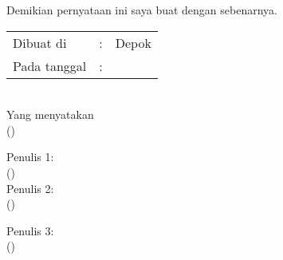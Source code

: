 \noindent Demikian pernyataan ini saya buat dengan sebenarnya.

\ifx\blank\npmDua\else\clearpage\fi



\begin{center}
	\vspace*{0.8cm}
	\begin{tabular}{lll}
		Dibuat di&: & Depok \\
		Pada tanggal&: & \tanggalSiapSidang \\
	\end{tabular}\\

	\vspace*{0.2cm}
	Yang menyatakan \\
	\ifx\blank\npmDua
		\vspace*{2cm}
		(\penulisSatu)
	\else
		\begin{multicols}{2}
			Penulis 1:\\
			\vspace*{2cm}
			(\penulisSatu)\\
			
			Penulis 2:\\
			\vspace*{2cm}
			(\penulisDua)\\
		\end{multicols}
	\fi
	\ifx\blank\npmTiga\else
		\vspace*{0.2cm}
		Penulis 3:\\
		\vspace*{2cm}
		(\penulisTiga)
	\fi
\end{center}

\newpage
